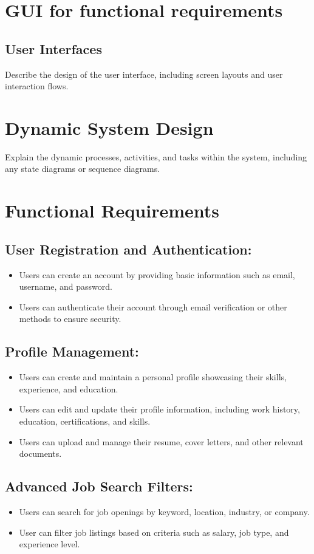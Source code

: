 \documentclass[titlepage]{article}
\begin{document}
\section{GUI for functional requirements}

\subsection{User Interfaces}
Describe the design of the user interface, including screen layouts and user interaction flows.

\section{Dynamic System Design}
Explain the dynamic processes, activities, and tasks within the system, including any state diagrams or sequence diagrams.

\section{Functional Requirements}
\subsection{User Registration and Authentication:}
\begin{itemize}
    \item Users can create an account by providing basic information such as email, username, and password.
    \item Users can authenticate their account through email verification or other methods to ensure security.
\end{itemize}
\subsection{Profile Management:}
\begin{itemize}
    \item Users can create and maintain a personal profile showcasing their skills, experience, and education.
    \item Users can edit and update their profile information, including work history, education, certifications, and skills.
    \item Users can upload and manage their resume, cover letters, and other relevant documents.
\end{itemize}

\subsection{Advanced Job Search Filters:}
\begin{itemize}
    \item Users can search for job openings by keyword, location, industry, or company.
    \item User can filter job listings based on criteria such as salary, job type, and experience level.
\end{itemize}
\end{document}
